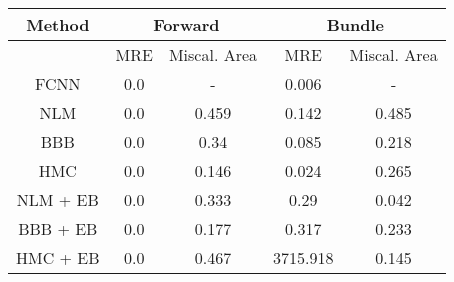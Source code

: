 \documentclass[convert={outext=.png}]{standalone}
\begin{document}
\begin{tabular}{c c c c c}
\hline
\hline
Method &  \multicolumn{2}{c}{Forward} & \multicolumn{2}{c}{Bundle} \\ \hline
 & MRE & Miscal. Area & MRE & Miscal. Area \\
 FCNN & 0.0 & - & 0.006 & - \\
 \hline
 NLM & 0.0 & 0.459 & 0.142 & 0.485 \\
 BBB & 0.0 & 0.34 & 0.085 & 0.218 \\
 HMC & 0.0 & 0.146 & 0.024 & 0.265 \\
 \hline
 NLM + EB & 0.0 & 0.333 & 0.29 & 0.042 \\
 BBB + EB & 0.0 & 0.177 & 0.317 & 0.233 \\
 HMC + EB & 0.0 & 0.467 & 3715.918 & 0.145 \\
\hline
\hline
\end{tabular}
\end{document}
